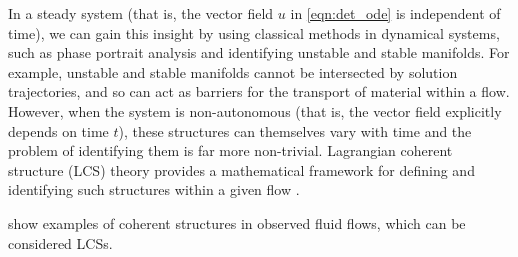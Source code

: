In a steady system (that is, the vector field \(u\) in \cref{eqn:det_ode} is independent of time), we can gain this insight by using classical methods in dynamical systems, such as phase portrait analysis and identifying unstable and stable manifolds.
For example, unstable and stable manifolds cannot be intersected by solution trajectories, and so can act as barriers for the transport of material within a flow.
However, when the system is non-autonomous (that is, the vector field explicitly depends on time \(t\)), these structures can themselves vary with time and the problem of identifying them is far more non-trivial.
Lagrangian coherent structure (LCS) theory provides a mathematical framework for defining and identifying such structures within a given flow \citep{BalasuriyaEtAl_2018_GeneralizedLagrangianCoherent}.


 show examples of coherent structures in observed fluid flows, which can be considered LCSs.

